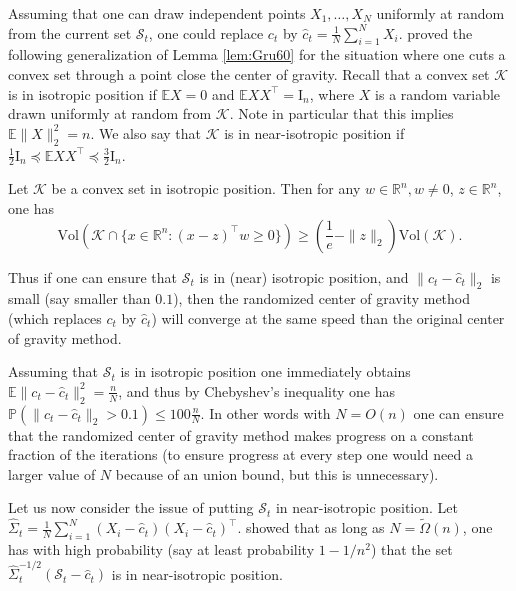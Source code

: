 \documentclass[openany]{now}
\newcommand{\mI}{\mathrm{I}}
\renewcommand{\P}{\mathbb{P}}
\newcommand{\E}{\mathbb{E}}
\newcommand{\R}{\mathbb{R}}
\newcommand{\cS}{\mathcal{S}}
\newcommand{\cK}{\mathcal{K}}
\renewcommand{\tilde}{\widetilde}
\begin{document}
Assuming that one can draw independent points $X_1, \hdots, X_N$ uniformly at random from the current set $\cS_t$, one could replace $c_t$ by $\hat{c}_t = \frac{1}{N} \sum_{i=1}^N X_i$. \cite{BerVem04} proved the following generalization of Lemma \ref{lem:Gru60} for the situation where one cuts a convex set through a point close the center of gravity. Recall that a convex set $\cK$ is in isotropic position if $\E X = 0$ and $\E X X^{\top} = \mI_n$, where $X$ is a random variable drawn uniformly at random from $\cK$. Note in particular that this implies $\E \|X\|_2^2 = n$. We also say that $\cK$ is in near-isotropic position if $\frac{1}{2} \mI_n \preceq \E X X^{\top} \preceq \frac3{2} \mI_n$.
\begin{lemma} \label{lem:BerVem04}
Let $\cK$ be a convex set in isotropic position. Then for any $w \in \R^n, w \neq 0$, $z \in \R^n$, one has
$$\mathrm{Vol} \left( \cK \cap \{x \in \R^n : (x-z)^{\top} w \geq 0\} \right) \geq \left(\frac{1}{e} - \|z\|_2\right) \mathrm{Vol} (\cK) .$$
\end{lemma}
Thus if one can ensure that $\cS_t$ is in (near) isotropic position, and $\|c_t - \hat{c}_t\|_2$ is small (say smaller than $0.1$), then the randomized center of gravity method (which replaces $c_t$ by $\hat{c}_t$) will converge at the same speed than the original center of gravity method. 

Assuming that $\cS_t$ is in isotropic position one immediately obtains $\E \|c_t - \hat{c}_t\|_2^2 = \frac{n}{N}$, and thus by Chebyshev's inequality one has $\P(\|c_t - \hat{c}_t\|_2 > 0.1) \leq 100 \frac{n}{N}$. In other words with $N = O(n)$ one can ensure that the randomized center of gravity method makes progress on a constant fraction of the iterations (to ensure progress at every step one would need a larger value of $N$ because of an union bound, but this is unnecessary).

Let us now consider the issue of putting $\cS_t$ in near-isotropic position. Let $\hat{\Sigma}_t = \frac1{N} \sum_{i=1}^N (X_i-\hat{c}_t) (X_i-\hat{c}_t)^{\top}$. \cite{Rud99} showed that as long as $N= \tilde{\Omega}(n)$, one has with high probability (say at least probability $1-1/n^2$) that the set $\hat{\Sigma}_t^{-1/2} (\cS_t - \hat{c}_t)$ is in near-isotropic position.
\end{document}
